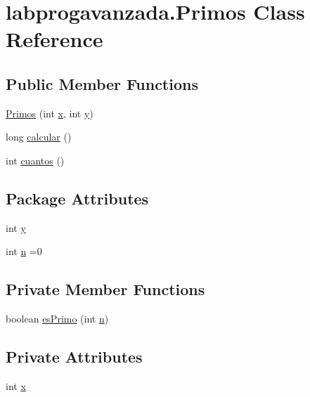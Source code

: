 \hypertarget{classlabprogavanzada_1_1_primos}{}\section{labprogavanzada.\+Primos Class Reference}
\label{classlabprogavanzada_1_1_primos}
\subsection*{Public Member Functions}
\begin{DoxyCompactItemize}
\item 
\mbox{\hyperlink{classlabprogavanzada_1_1_primos_a43f14cebd555907aaaf5270a66055f6a}{Primos}} (int \mbox{\hyperlink{classlabprogavanzada_1_1_primos_a0755e3305c771aa34e184c9719b0e2ff}{x}}, int \mbox{\hyperlink{classlabprogavanzada_1_1_primos_a5a48c8b02403aee0c1741dd3abf91f47}{y}})
\item 
long \mbox{\hyperlink{classlabprogavanzada_1_1_primos_a6127829b3e6ef1830edf5714b0cc28a8}{calcular}} ()
\item 
int \mbox{\hyperlink{classlabprogavanzada_1_1_primos_a4c867a357848bb685f59120ae62844f0}{cuantos}} ()
\end{DoxyCompactItemize}
\subsection*{Package Attributes}
\begin{DoxyCompactItemize}
\item 
int \mbox{\hyperlink{classlabprogavanzada_1_1_primos_a5a48c8b02403aee0c1741dd3abf91f47}{y}}
\item 
int \mbox{\hyperlink{classlabprogavanzada_1_1_primos_a07e981f7bb9b39f7ead20be760e628fb}{n}} =0
\end{DoxyCompactItemize}
\subsection*{Private Member Functions}
\begin{DoxyCompactItemize}
\item 
boolean \mbox{\hyperlink{classlabprogavanzada_1_1_primos_a7eeebcb76da9a4ad43a1889bdee5bb07}{es\+Primo}} (int \mbox{\hyperlink{classlabprogavanzada_1_1_primos_a07e981f7bb9b39f7ead20be760e628fb}{n}})
\end{DoxyCompactItemize}
\subsection*{Private Attributes}
\begin{DoxyCompactItemize}
\item 
int \mbox{\hyperlink{classlabprogavanzada_1_1_primos_a0755e3305c771aa34e184c9719b0e2ff}{x}}
\end{DoxyCompactItemize}


